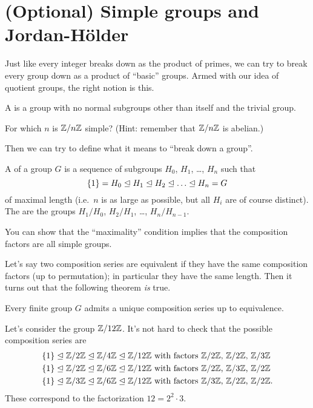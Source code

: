 \section{(Optional) Simple groups and Jordan-H\"older}
Just like every integer breaks down as the product of primes,
we can try to break every group down as a product of ``basic'' groups.
Armed with our idea of quotient groups, the right notion is this.

\begin{definition}
	A  is a group with no normal subgroups
	other than itself and the trivial group.
\end{definition}
\begin{ques}
	For which $n$ is $\mathbb Z/n\mathbb Z$ simple? (Hint: remember that $\mathbb Z/n\mathbb Z$ is abelian.)
\end{ques}

Then we can try to define what it means to ``break down a group''.
\begin{definition}
	A  of a group $G$ is a sequence of subgroups
	$H_0$, $H_1$, \dots, $H_n$ such that
	\[ \{1\} = H_0 \normalin H_1 \normalin H_2 \normalin \dots
		\normalin H_n = G \]
	of maximal length (i.e.\ $n$ is as large as possible,
	but all $H_i$ are of course distinct).
	The  are the groups
	$H_1/H_0$, $H_2/H_1$, \dots, $H_n/H_{n-1}$.
\end{definition}
You can show that the ``maximality'' condition implies that the composition factors are all simple groups.

Let's say two composition series are equivalent if they have the same composition factors (up to permutation); in particular they have the same length.
Then it turns out that the following theorem \emph{is} true.
\begin{theorem}
	Every finite group $G$ admits a unique composition series up to equivalence.
\end{theorem}

\begin{example}
	[Fundamental theorem of arithmetic when $n=12$]
	Let's consider the group $\mathbb Z/12\mathbb Z$.
	It's not hard to check that the possible composition series are
	\begin{align*}
		\{1\} \trianglelefteq \mathbb Z/2\mathbb Z \trianglelefteq \mathbb Z/4\mathbb Z \trianglelefteq \mathbb Z/12\mathbb Z
		& \text{ with factors $\mathbb Z/2\mathbb Z$, $\mathbb Z/2\mathbb Z$, $\mathbb Z/3\mathbb Z$} \\
		\{1\} \trianglelefteq \mathbb Z/2\mathbb Z \trianglelefteq \mathbb Z/6\mathbb Z \trianglelefteq \mathbb Z/12\mathbb Z
		& \text{ with factors $\mathbb Z/2\mathbb Z$, $\mathbb Z/3\mathbb Z$, $\mathbb Z/2\mathbb Z$} \\
		\{1\} \trianglelefteq \mathbb Z/3\mathbb Z \trianglelefteq \mathbb Z/6\mathbb Z \trianglelefteq \mathbb Z/12\mathbb Z
		& \text{ with factors $\mathbb Z/3\mathbb Z$, $\mathbb Z/2\mathbb Z$, $\mathbb Z/2\mathbb Z$}.
	\end{align*}
	These correspond to the factorization $12 = 2^2 \cdot 3$.
\end{example}

